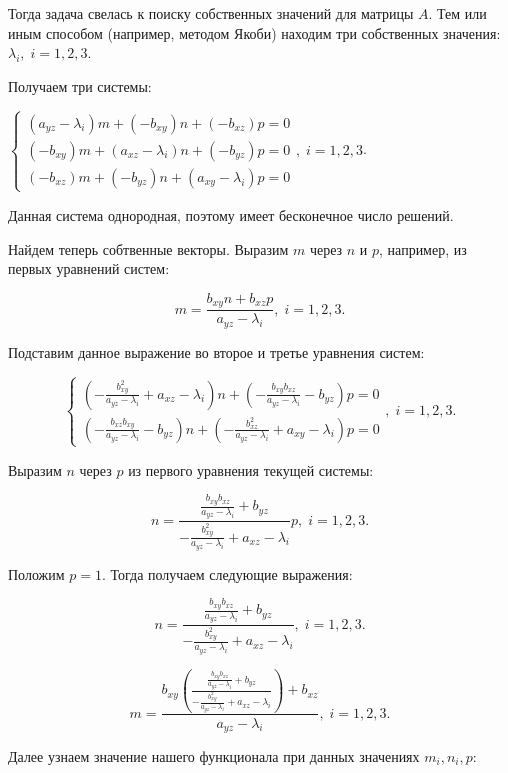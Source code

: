 \documentclass[article,final,14pt]{scrreprt}
\begin{document}
Тогда задача свелась к поиску собственных значений для матрицы $A$. Тем или иным способом (например, методом Якоби) находим три собственных значения: $\lambda_i,\;i=1,2,3$.

Получаем три системы:

\begin{center}
	$\begin{cases}
		(a_{yz} - \lambda_i ) m + (-b_{xy}) n + (-b_{xz}) p = 0 \\
		(-b_{xy})m + (a_{xz} - \lambda_i)n + (-b_{yz})p = 0 \\
		(-b_{xz})m + (-b_{yz})n + (a_{xy} - \lambda_i)p = 0
	\end{cases}, \; i = 1,2,3$.
\end{center}

Данная система однородная, поэтому имеет бесконечное число решений.

Найдем теперь собтвенные векторы. Выразим $m$ через $n$ и $p$, например, из первых уравнений систем:

$$m = \frac{b_{xy} n + b_{xz} p }{a_{yz} - \lambda_i}, \; i = 1,2,3.$$

Подставим данное выражение во второе и третье уравнения систем:

$$\begin{cases}
	(- \frac{b_{xy}^2}{a_{yz} - \lambda_i} + a_{xz} - \lambda_i) n + (-\frac{b_{xy} b_{xz}}{a_{yz} - \lambda_i} - b_{yz})p = 0 \\
	(-\frac{b_{xz} b_{xy}}{a_{yz} - \lambda_i} - b_{yz}) n + (- \frac{b_{xz}^2}{a_{yz} - \lambda_i} + a_{xy} - \lambda_i) p = 0
\end{cases}, \; i = 1,2,3.$$

Выразим $n$ через $p$ из первого уравнения текущей системы:

$$n = \frac{\frac{b_{xy} b_{xz}}{a_{yz} - \lambda_i} + b_{yz}}{- \frac{b_{xy}^2}{a_{yz} - \lambda_i} + a_{xz} - \lambda_i} p, \; i=1,2,3.$$

Положим $p = 1$. Тогда получаем следующие выражения:

$$n = \frac{\frac{b_{xy} b_{xz}}{a_{yz} - \lambda_i} + b_{yz}}{- \frac{b_{xy}^2}{a_{yz} - \lambda_i} + a_{xz} - \lambda_i}, \; i =1,2,3.$$

$$m = \frac{b_{xy} \left(\frac{\frac{b_{xy} b_{xz}}{a_{yz} - \lambda_i} + b_{yz}}{- \frac{b_{xy}^2}{a_{yz} - \lambda_i} + a_{xz} - \lambda_i}\right) + b_{xz}}{a_{yz} - \lambda_i}, \; i = 1,2,3.$$

Далее узнаем значение нашего функционала при данных значениях $m_i, n_i, p$:
\end{document}

